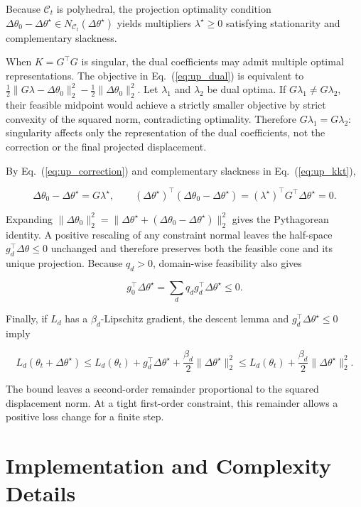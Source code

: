 \documentclass{article}
\begin{document}
Because $\mathcal C_t$ is polyhedral, the projection optimality condition $\Delta\theta_0-\Delta\theta^\star\in N_{\mathcal C_t}(\Delta\theta^\star)$ yields multipliers $\lambda^\star\ge0$ satisfying stationarity and complementary slackness.

When $K=G^\top G$ is singular, the dual coefficients may admit multiple optimal representations. The objective in Eq.~(\ref{eq:up_dual}) is equivalent to $\tfrac12\|G\lambda-\Delta\theta_0\|_2^2-\tfrac12\|\Delta\theta_0\|_2^2$. Let $\lambda_1$ and $\lambda_2$ be dual optima. If $G\lambda_1\ne G\lambda_2$, their feasible midpoint would achieve a strictly smaller objective by strict convexity of the squared norm, contradicting optimality. Therefore $G\lambda_1=G\lambda_2$: singularity affects only the representation of the dual coefficients, not the correction or the final projected displacement.

By Eq.~(\ref{eq:up_correction}) and complementary slackness in Eq.~(\ref{eq:up_kkt}),

\[
\Delta\theta_0-\Delta\theta^\star=G\lambda^\star,
\qquad
(\Delta\theta^\star)^\top(\Delta\theta_0-\Delta\theta^\star)
=(\lambda^\star)^\top G^\top\Delta\theta^\star=0.
\]

Expanding $\|\Delta\theta_0\|_2^2=\|\Delta\theta^\star+(\Delta\theta_0-\Delta\theta^\star)\|_2^2$ gives the Pythagorean identity. A positive rescaling of any constraint normal leaves the half-space $g_d^\top\Delta\theta\le0$ unchanged and therefore preserves both the feasible cone and its unique projection. Because $q_d>0$, domain-wise feasibility also gives

\[
g_0^\top\Delta\theta^\star
=\sum_dq_d g_d^\top\Delta\theta^\star\le0.
\]

Finally, if $L_d$ has a $\beta_d$-Lipschitz gradient, the descent lemma and $g_d^\top\Delta\theta^\star\le0$ imply

\[
L_d(\theta_t+\Delta\theta^\star)
\le L_d(\theta_t)+g_d^\top\Delta\theta^\star
+\frac{\beta_d}{2}\|\Delta\theta^\star\|_2^2
\le L_d(\theta_t)+\frac{\beta_d}{2}\|\Delta\theta^\star\|_2^2.
\]

The bound leaves a second-order remainder proportional to the squared displacement norm. At a tight first-order constraint, this remainder allows a positive loss change for a finite step. 

\section{Implementation and Complexity Details}
\label{app:implementation}
\end{document}

